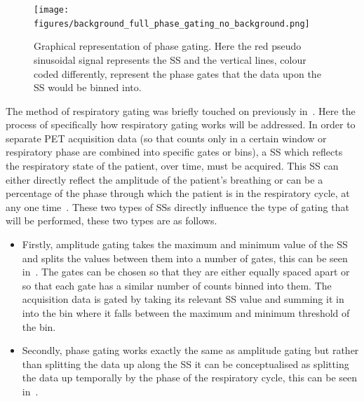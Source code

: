            \begin{figure}
                \centering
                    
                \texttt{[image: figures/background\_full\_phase\_gating\_no\_background.png]}
                    
                \captionsetup{singlelinecheck=false, justification=raggedright}
                \caption{Graphical representation of phase gating. Here the red pseudo sinusoidal signal represents the \gls{SS} and the vertical lines, colour coded differently, represent the phase gates that the data upon the \gls{SS} would be binned into.} \label{fig:respiratory_gating_full_phase_gating}
            \end{figure}
            
            The method of respiratory gating was briefly touched on previously in~. Here the process of specifically how respiratory gating works will be addressed. In order to separate \gls{PET} acquisition data (so that counts only in a certain window or respiratory phase are combined into specific gates or bins), a \gls{SS} which reflects the respiratory state of the patient, over time, must be acquired. This \gls{SS} can either directly reflect the amplitude of the patient's breathing or can be a percentage of the phase through which the patient is in the respiratory cycle, at any one time~\parencite{Kitamura2017TheMethods.}. These two types of \glspl{SS} directly influence the type of gating that will be performed, these two types are as follows.
            
            \begin{itemize}
                \item Firstly, amplitude gating takes the maximum and minimum value of the \gls{SS} and splits the values between them into a number of gates, this can be seen in~. The gates can be chosen so that they are either equally spaced apart or so that each gate has a similar number of counts binned into them. The acquisition data is gated by taking its relevant \gls{SS} value and summing it in into the bin where it falls between the maximum and minimum threshold of the bin.
                
                \item Secondly, phase gating works exactly the same as amplitude gating but rather than splitting the data up along the \gls{SS} it can be conceptualised as splitting the data up temporally by the phase of the respiratory cycle, this can be seen in~.
            \end{itemize}
            
